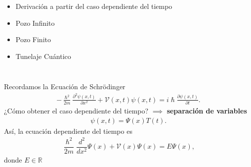 \documentclass[aspectratio=1610]{beamer}
\newcommand*{\field}[1]{\mathbb{#1}}
\begin{document}
\begin{frame}
\frametitle{ }
\begin{columns}
\column{37em}
\begin{itemize}\itemsep1em
  \justifying
  \item  \textcolor{Ocean}{Derivación a partir del caso dependiente del tiempo} 
  \item  \textcolor{Ocean}{Pozo Infinito} 
  \item  \textcolor{Ocean}{Pozo Finito} 
  \item  \textcolor{Ocean}{Tunelaje Cuántico}
\end{itemize}
\end{columns}
\end{frame}





\bgroup
\begin{frame}{}
Recordamos la Ecuación de Schrödinger
\begin{align}
    -\frac{\hslash^2}{2m}\frac{\partial^2\psi(x,t)}{\partial x^2} + \mathcal{V}(x,t)\psi(x,t) = i\hslash\frac{\partial\psi(x,t)}{\partial t}.
    \label{eq:ECDepTiemp}
\end{align}
\vspace{0.05\textheight} 
¿Cómo obtener el caso dependiente del tiempo? $\implies$ \textbf{separación de variables}
    \begin{align*}
    \psi(x,t) = \Psi(x)T(t).
    \end{align*}
\vspace{0.05\textheight} 
Así, la ecuación dependiente del tiempo es 
\begin{align}
\dfrac{\hslash^2}{2m}\dfrac{d^2}{dx^2}\Psi(x) + \mathcal{V}(x)\Psi(x) = E \Psi(x),
\label{eq:HamiltonianEigenValues}
\end{align}
donde $E \in \field{R}$

\end{frame}
\end{document}
